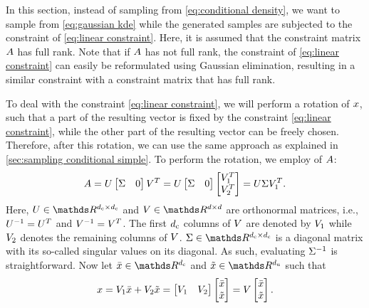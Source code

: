 In this section, instead of sampling from \cref{eq:conditional density}, we want to sample from \cref{eq:gaussian kde} while the generated samples are subjected to the constraint of \cref{eq:linear constraint}.
Here, it is assumed that the constraint matrix $A$ has full rank.
Note that if $A$ has not full rank, the constraint of \cref{eq:linear constraint} can easily be reformulated using Gaussian elimination, resulting in a similar constraint with a constraint matrix that has full rank.

To deal with the constraint \cref{eq:linear constraint}, we will perform a rotation of $x$, such that a part of the resulting vector is fixed by the constraint \cref{eq:linear constraint}, while the other part of the resulting vector can be freely chosen.
Therefore, after this rotation, we can use the same approach as explained in \cref{sec:sampling conditional simple}.
To perform the rotation, we employ  of $A$:
\begin{equation}
	\label{eq:svd constraint matrix}
	A 
	= U \begin{bmatrix} \Sigma & 0 \end{bmatrix} V^T
	= U
	\begin{bmatrix} \Sigma & 0 \end{bmatrix}
	\begin{bmatrix} V_1^T \\ V_2^T \end{bmatrix}
	= U \Sigma V_1^T.
\end{equation}
Here, $\svdu \in \realnumbers^{\dimensionparta \times \dimensionparta}$ and $\svdv \in \realnumbers^{\dimension \times \dimension}$ are orthonormal matrices, i.e., $U^{-1} = U^T$ and $V^{-1} = V^T$.
The first $d_\mathrm{c}$ columns of $V$ are denoted by $V_1$ while $V_2$ denotes the remaining columns of $V$.
$\svds \in \realnumbers^{\dimensionparta \times \dimensionparta}$ is a diagonal matrix with its so-called singular values on its diagonal.
As such, evaluating $\Sigma^{-1}$ is straightforward.
Now let $\variableconstrained \in \realnumbers^{\dimensionparta}$ and $\variableunconstrained \in \realnumbers^{\dimensionpartb}$ such that
\begin{equation}
	\label{eq:rotation variable}
	x = V_1 \bar{x} + V_2 \tilde{x} 
	= \begin{bmatrix} V_1 & V_2 \end{bmatrix} \begin{bmatrix} \bar{x} \\ \tilde{x} \end{bmatrix}
	= V \begin{bmatrix} \bar{x} \\ \tilde{x} \end{bmatrix}.
\end{equation}
